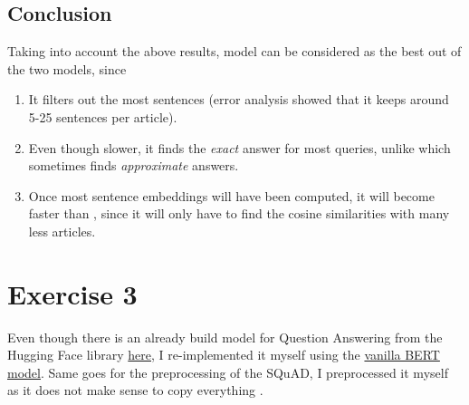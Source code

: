 \documentclass[12pt]{report}
\begin{document}
\subsection*{Conclusion}
Taking into account the above results, model  can be considered
as the best out of the two models, since
\begin{enumerate}
    \item It filters out the most sentences (error analysis showed that it keeps
        around 5-25 sentences per article).
    \item Even though slower, it finds the \textit{exact} answer for most queries,
        unlike  which sometimes finds
        \textit{approximate} answers.
    \item Once most sentence embeddings will have been computed, 
        it will become faster than , since it
        will only have to find the cosine similarities with many less articles.
\end{enumerate} \clearpage


\section*{Exercise 3}
Even though there is an already build model for Question Answering from the
Hugging Face library
\href{https://huggingface.co/transformers/model_doc/bert.html#bertforquestionanswering}{here},
I re-implemented it myself using the
\href{https://huggingface.co/transformers/model_doc/bert.html#bertmodel}{vanilla BERT model}.
Same goes for the preprocessing of the SQuAD, I preprocessed it myself as it does not make
sense to copy everything \smiley{}.
\end{document}
